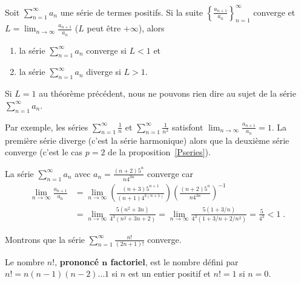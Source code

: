 {\begin{focus}{\thm} \label{Alembert}
Soit $\displaystyle \sum_{n=1}^\infty a_n$ une série de termes
positifs.  Si la suite $\displaystyle \left\{ \frac{a_{n+1}}{a_n}
\right\}_{n=1}^\infty$ converge et
$\displaystyle L = \lim_{n\rightarrow \infty} \frac{a_{n+1}}{a_n}$
($L$ peut être $+\infty$), alors
\begin{enumerate}
\item la série $\displaystyle \sum_{n=1}^\infty a_n$ converge si $L<1$ et
\item la série $\displaystyle \sum_{n=1}^\infty a_n$ diverge si $L>1$.
\end{enumerate}
\end{focus}

\begin{rmk}
Si $L=1$ au théorème précédent, nous ne pouvons rien dire au sujet de la
série $\displaystyle \sum_{n=1}^\infty a_n$.

Par exemple, les séries $\displaystyle \sum_{n=1}^\infty \frac{1}{n}$
et $\displaystyle \sum_{n=1}^\infty \frac{1}{n^2}$ satisfont
$\displaystyle \lim_{n\rightarrow \infty} \frac{a_{n+1}}{a_n} = 1$.
La première série diverge (c'est la série harmonique) alors que la
deuxième série converge (c'est le cas $p=2$ de la
proposition~\ref{Pseries}).
\label{dAlembert1}
\end{rmk}

\begin{egg}
La série $\displaystyle \sum_{n=1}^\infty a_n$ avec
$\displaystyle a_n = \frac{(n+2)5^n}{n 4^{3n}}$ converge car
\begin{align*}
\lim_{n\rightarrow \infty} \frac{a_{n+1}}{a_n} &=
\lim_{n\rightarrow \infty} \left( \frac{(n+3)5^{n+1}}{(n+1) 4^{3(n+1)}}
\right) \left( \frac{(n+2)5^n}{n 4^{3n}} \right)^{-1} \\
&=\lim_{n\rightarrow \infty} \frac{5(n^2+3n)}{4^3(n^2+3n+2)}
=\lim_{n\rightarrow \infty} \frac{5(1+3/n)}{4^3(1+3/n+2/n^2)}
= \frac{5}{4^3} < 1 \; .
\end{align*}
\end{egg}

\begin{egg}
Montrons que la série
$\displaystyle \sum_{n=1}^\infty \frac{n!}{(2n+1)!}$ converge.

Le nombre $n!$,
{\bfseries prononcé $\mathbf n$ factoriel},
est le nombre défini par $n! = n(n-1)(n-2)\ldots 1$
si $n$ est un entier positif et $n! = 1$ si $n=0$.


\end{egg}}
